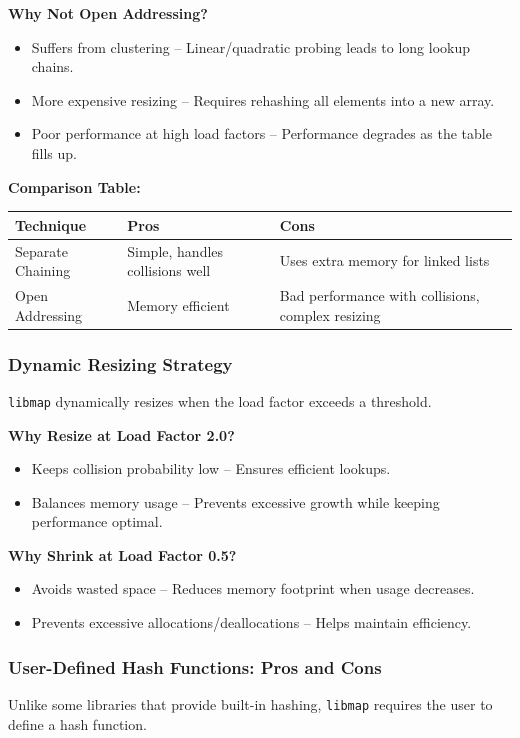 \documentclass[titlepage]{article}
\begin{document}
\textbf{Why Not Open Addressing?}
\begin{itemize}
    \item Suffers from clustering -- Linear/quadratic probing leads to long lookup chains.
    \item More expensive resizing -- Requires rehashing all elements into a new array.
    \item Poor performance at high load factors -- Performance degrades as the table fills up.
\end{itemize}

\textbf{Comparison Table:}
\begin{center}
\begin{tabular}{@{} l l l @{} }
\toprule
\textbf{Technique} & \textbf{Pros} & \textbf{Cons} \\
\midrule
Separate Chaining & Simple, handles collisions well & Uses extra memory for linked lists \\
Open Addressing & Memory efficient & Bad performance with collisions, complex resizing \\
\bottomrule
\end{tabular}
\end{center}

\subsubsection{Dynamic Resizing Strategy}
\texttt{libmap} dynamically resizes when the load factor exceeds a threshold.

\textbf{Why Resize at Load Factor 2.0?}
\begin{itemize}
    \item Keeps collision probability low -- Ensures efficient lookups.
    \item Balances memory usage -- Prevents excessive growth while keeping performance optimal.
\end{itemize}

\textbf{Why Shrink at Load Factor 0.5?}
\begin{itemize}
    \item Avoids wasted space -- Reduces memory footprint when usage decreases.
    \item Prevents excessive allocations/deallocations -- Helps maintain efficiency.
\end{itemize}

\subsubsection{User-Defined Hash Functions: Pros and Cons}
Unlike some libraries that provide built-in hashing, \texttt{libmap} requires the user to define a hash function.
\end{document}
